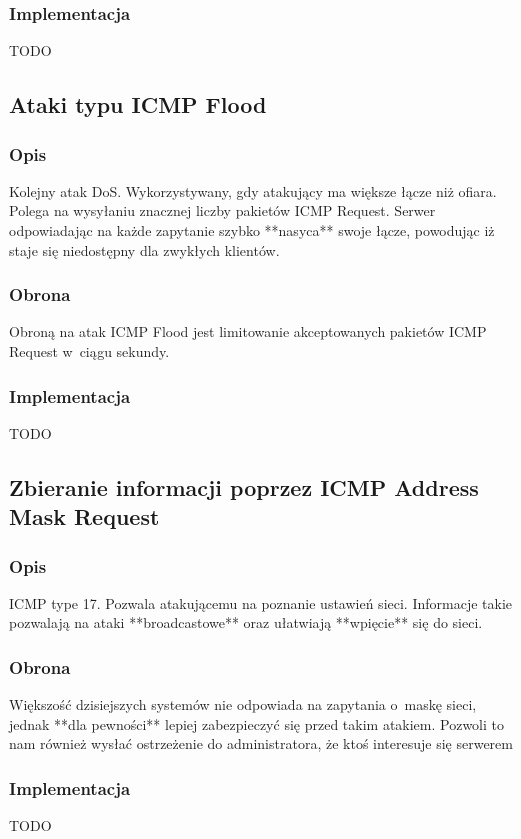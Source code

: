 \documentclass[a4paper,10pt]{article}
\begin{document}
		\subsubsection{Implementacja}
			TODO
	\subsection{Ataki typu ICMP Flood}
		\subsubsection{Opis}
			Kolejny atak DoS. Wykorzystywany, gdy atakujący ma większe łącze niż ofiara. Polega na wysyłaniu znacznej liczby pakietów ICMP Request. Serwer odpowiadając na każde zapytanie szybko **nasyca** swoje łącze, powodując iż staje się niedostępny dla zwykłych klientów.
		\subsubsection{Obrona}
			Obroną na atak ICMP Flood jest limitowanie akceptowanych pakietów ICMP Request w~ciągu sekundy.
		\subsubsection{Implementacja}
			TODO
	\subsection{Zbieranie informacji poprzez ICMP Address Mask Request}
		\subsubsection{Opis}
			ICMP type 17. Pozwala atakującemu na poznanie ustawień sieci. Informacje takie pozwalają na ataki **broadcastowe** oraz ułatwiają **wpięcie** się do sieci.\\
		\subsubsection{Obrona}
			Większość dzisiejszych systemów nie odpowiada na zapytania o~maskę sieci, jednak **dla pewności** lepiej zabezpieczyć się przed takim atakiem. Pozwoli to nam również wysłać ostrzeżenie do administratora, że ktoś interesuje się serwerem
		\subsubsection{Implementacja}
			TODO
\end{document}
